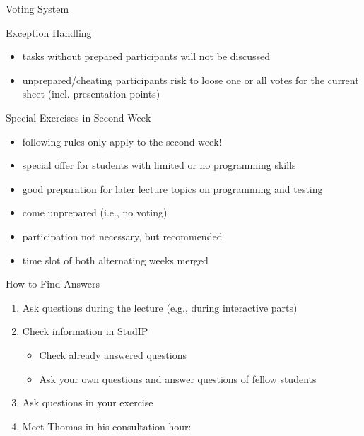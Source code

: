 \begin{frame}{\insertsubsection}
\begin{fancycolumns}[widths={30}]
\begin{definition}{Voting System }
\begin{itemize}
			\end{itemize}
		\end{definition}\pause\pause
		\begin{note}{Exception Handling}
			\begin{itemize}
				\item tasks without prepared participants will not be discussed
				\item unprepared/cheating participants risk to loose one or all votes for the current sheet (incl. presentation points)
			\end{itemize}
		\end{note}
	\end{fancycolumns}
\end{frame}

\begin{frame}{\insertsubsection}
	\begin{fancycolumns}[animation=none]
		\begin{definition}{Special Exercises in Second Week}
			\begin{itemize}
				\item following rules only apply to the second week!
				\item special offer for students with limited or no programming skills
				\item good preparation for later lecture topics on programming and testing
				\item come unprepared (i.e., no voting)
				\item participation not necessary, but recommended
				\item time slot of both alternating weeks merged
			\end{itemize}
		\end{definition}
		\nextcolumn
		\begin{definition}{How to Find Answers}
			\begin{enumerate}
				\item<+-> Ask questions during the lecture (e.g., during interactive parts)
				\item<+-> Check information in StudIP
				\begin{itemize}
					\item Check already answered questions
					\item Ask your own questions and answer questions of fellow students
				\end{itemize}
				\item<+-> Ask questions in your exercise
				\item<+-> Meet Thomas in his consultation hour:\\

\end{enumerate}
\end{definition}
\end{fancycolumns}
\end{frame}
